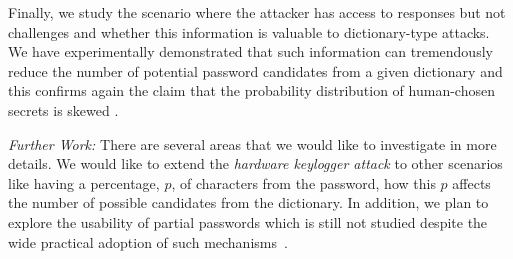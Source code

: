 \documentclass{llncs}
\begin{document}
Finally, we study the scenario where the attacker has access to responses but not challenges
and whether this information is valuable to dictionary-type attacks. We have experimentally demonstrated that such information can tremendously reduce the number of potential password candidates from a given
dictionary and this confirms again the claim
that the probability distribution of human-chosen secrets is
skewed \cite{bonneau,bonneau2}.

\textit{Further Work:} There are several areas that we would like to investigate
in more details. We would like to extend the \textit{hardware
keylogger attack} to
other scenarios like having a percentage, $p$, of characters from the password, how this $p$ affects the number of possible candidates from the dictionary. In addition,
we plan to explore the usability of partial passwords
which is still not studied despite the wide practical adoption of such mechanisms~\cite{usabilityOB}.


\newpage
\end{document}
